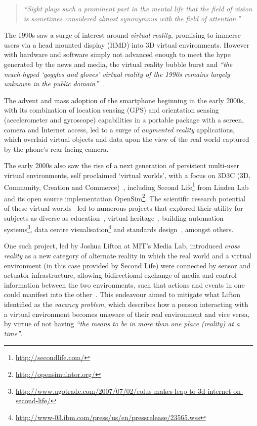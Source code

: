 \begin{quote}
	\textit{``Sight plays such a prominent part in the mental life that the field of vision is sometimes considered almost synonymous with the field of attention.''}~\cite{Lucas1951}
\end{quote}

The 1990s saw a surge of interest around \textit{virtual reality}, promising to immerse users via a head mounted display (HMD) into 3D virtual environments. However with hardware and software simply not advanced enough to meet the hype generated by the news and media, the virtual reality bubble burst and \textit{``the much-hyped `goggles and gloves' virtual reality of the 1990s remains largely unknown in the public domain''}~\cite{Green2014}.

The advent and mass adoption of the smartphone beginning in the early 2000s, with its combination of location sensing (GPS) and orientation sensing (accelerometer and gyroscope) capabilities in a portable package with a screen, camera and Internet access, led to a surge of \textit{augmented reality} applications, which overlaid virtual objects and data upon the view of the real world captured by the phone's rear-facing camera.

The early 2000s also saw the rise of a next generation of persistent multi-user virtual environments, self proclaimed `virtual worlds', with a focus on 3D3C (3D, Community, Creation and Commerce)~\cite{Sevan2008}, including Second Life\footnote{\url{http://secondlife.com/}} from Linden Lab and its open source implementation OpenSim\footnote{\url{http://opensimulator.org/}}. The scientific research potential of these virtual worlds~\cite{Bainbridge2007} led to numerous projects that explored their utility for subjects as diverse as education~\cite{Allison2012}, virtual heritage~\cite{Kennedy2013}, building automation systems\footnote{\url{http://www.ugotrade.com/2007/07/02/eolus-makes-leap-to-3d-internet-on-second-life/}}, data centre visualisation\footnote{\url{http://www-03.ibm.com/press/us/en/pressrelease/23565.wss}} and standards design~\cite{Gelissen2011a}, amongst others.

One such project, led by Joshua Lifton at MIT's Media Lab, introduced \textit{cross reality} as a new category of alternate reality in which the real world and a virtual environment (in this case provided by Second Life) were connected by sensor and actuator infrastructure, allowing bidirectional exchange of media and control information between the two environments, such that actions and events in one could manifest into the other~\cite{Lifton2007a}. This endeavour aimed to mitigate what Lifton identified as the \textit{vacancy problem}, which describes how a person interacting with a virtual environment becomes unaware of their real environment and vice versa, by virtue of not having \textit{``the means to be in more than one place (reality) at a time''}.

